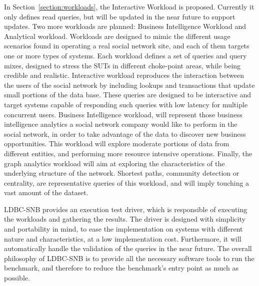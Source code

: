 In Section~\ref{section:workloads}, the Interactive Workload is proposed. Currently
it only defines read queries, but will be updated in the near future to support
updates. Two more workloads are planned:  Business Intelligence Workload and
Analytical workload. Workloads are designed to mimic the different usage
scenarios found in operating a real social network site, and each of them
targets one or more types of systems.  Each workload defines a set of queries
and query mixes, designed to stress the SUTs in different choke-point areas,
while being credible and realistic. Interactive workload reproduces the
interaction between the users of the social network by including lookups and
transactions that update small portions of the data base.  These queries are
designed to be interactive and target systems capable of responding such
queries with low latency for multiple concurrent users. Business Intelligence
workload, will represent those business intelligence analytics a social
network company would like to perform in the social network, in order to take
advantage of the data to discover new business opportunities. This workload
will explore moderate portions of data from different entities, and performing more
resource intensive operations. Finally, the graph analytics workload will aim at
exploring the characteristics of the underlying structure of the network. Shortest
paths, community detection or centrality, are representative queries of this workload,
and will imply touching a vast amount of the dataset.
 

LDBC-SNB provides an execution test driver, which is responsible of executing
the workloads and gathering the results. The driver is designed with simplicity
and portability in mind, to ease the implementation on systems with different
nature and characteristics, at a low implementation cost. Furthermore, it will
automatically handle the validation of the queries in the near future.  The
overall philosophy of LDBC-SNB is to provide all the necessary software tools
to run the benchmark, and therefore to reduce the benchmark's entry point as
much as possible.

